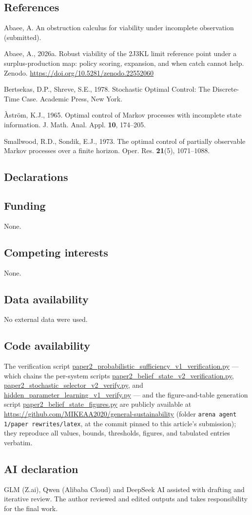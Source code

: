 \documentclass[10pt,twocolumn]{article}
\theoremstyle{plain}
\theoremstyle{definition}
\theoremstyle{remark}
\begin{document}
\subsection*{References}

{\footnotesize
Abaee, A. An obstruction calculus for viability under incomplete
observation (submitted).

Abaee, A., 2026a. Robust viability of the 2J3KL limit reference point
under a surplus-production map: policy scoring, expansion, and when
catch cannot help. Zenodo.
\url{https://doi.org/10.5281/zenodo.22552060}

Bertsekas, D.P., Shreve, S.E., 1978. Stochastic Optimal Control: The
Discrete-Time Case. Academic Press, New York.

\`{A}str\"{o}m, K.J., 1965. Optimal control of Markov processes with
incomplete state information. J. Math. Anal. Appl. \textbf{10},
174--205.

Smallwood, R.D., Sondik, E.J., 1973. The optimal control of partially
observable Markov processes over a finite horizon. Oper. Res.
\textbf{21}(5), 1071--1088.
}

\subsection*{Declarations}

\subsection*{Funding}
None.

\subsection*{Competing interests}
None.

\subsection*{Data availability}
No external data were used.

\subsection*{Code availability}
The verification script
\url{paper2_probabilistic_sufficiency_v1_verification.py} --- which chains
the per-system scripts \url{paper2_belief_state_v2_verification.py},
\url{paper2_stochastic_selector_v2_verify.py}, and
\url{hidden_parameter_learning_v1_verify.py} --- and the figure-and-table
generation script \url{paper2_belief_state_figures.py} are publicly
available at \url{https://github.com/MIKEAA2020/general-sustainability}
(folder \texttt{arena agent 1/paper rewrites/latex}, at the commit
pinned to this article's submission); they reproduce all values, bounds,
thresholds, figures, and tabulated entries verbatim.

\subsection*{AI declaration}
GLM (Z.ai), Qwen (Alibaba Cloud) and DeepSeek AI assisted with drafting
and iterative review. The author reviewed and edited outputs and takes
responsibility for the final work.
\end{document}
